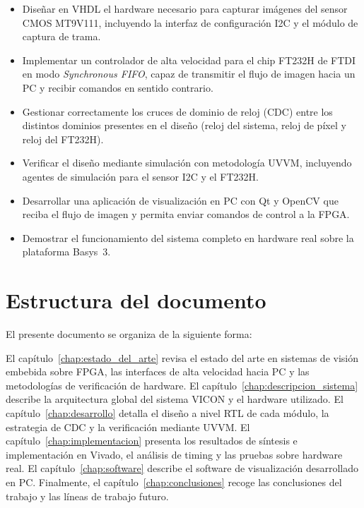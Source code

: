 \documentclass[../main.tex]{subfiles}
\begin{document}
\begin{itemize}
    \item Diseñar en \ac{VHDL} el hardware necesario para capturar imágenes del sensor CMOS MT9V111, incluyendo la interfaz de configuración I2C y el módulo de captura de trama.
    \item Implementar un controlador de alta velocidad para el chip FT232H de FTDI en modo \textit{Synchronous \ac{FIFO}}, capaz de transmitir el flujo de imagen hacia un PC y recibir comandos en sentido contrario.
    \item Gestionar correctamente los cruces de dominio de reloj (\ac{CDC}) entre los distintos dominios presentes en el diseño (reloj del sistema, reloj de píxel y reloj del FT232H).
    \item Verificar el diseño mediante simulación con metodología \ac{UVVM}, incluyendo agentes de simulación para el sensor I2C y el FT232H.
    \item Desarrollar una aplicación de visualización en PC con Qt y OpenCV que reciba el flujo de imagen y permita enviar comandos de control a la FPGA.
    \item Demostrar el funcionamiento del sistema completo en hardware real sobre la plataforma Basys~3.
\end{itemize}

\section{Estructura del documento}

El presente documento se organiza de la siguiente forma: 



El capítulo~\ref{chap:estado_del_arte} revisa el estado del arte en sistemas de visión embebida sobre FPGA, las interfaces de alta velocidad hacia PC y las metodologías de verificación de hardware.
El capítulo~\ref{chap:descripcion_sistema} describe la arquitectura global del sistema \ac{VICON} y el hardware utilizado.
El capítulo~\ref{chap:desarrollo} detalla el diseño a nivel \ac{RTL} de cada módulo, la estrategia de \ac{CDC} y la verificación mediante \ac{UVVM}.
El capítulo~\ref{chap:implementacion} presenta los resultados de síntesis e implementación en Vivado, el análisis de timing y las pruebas sobre hardware
real. 
El capítulo~\ref{chap:software} describe el software de visualización desarrollado en PC. 
Finalmente, el capítulo~\ref{chap:conclusiones} recoge las conclusiones del trabajo y las líneas de trabajo futuro.
\end{document}
